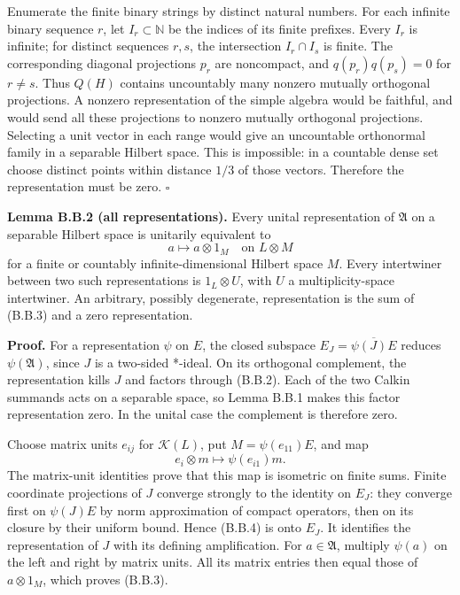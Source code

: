 \documentclass[
  11pt,
]{article}
\begin{document}
Enumerate the finite binary strings by distinct natural numbers. For
each infinite binary sequence \(r\), let \(I_r\subset\mathbb N\) be the
indices of its finite prefixes. Every \(I_r\) is infinite; for distinct
sequences \(r,s\), the intersection \(I_r\cap I_s\) is finite. The
corresponding diagonal projections \(p_r\) are noncompact, and
\(q(p_r)q(p_s)=0\) for \(r\ne s\). Thus \(Q(H)\) contains uncountably
many nonzero mutually orthogonal projections. A nonzero representation
of the simple algebra would be faithful, and would send all these
projections to nonzero mutually orthogonal projections. Selecting a unit
vector in each range would give an uncountable orthonormal family in a
separable Hilbert space. This is impossible: in a countable dense set
choose distinct points within distance \(1/3\) of those vectors.
Therefore the representation must be zero. \(\square\)

\textbf{Lemma B.B.2 (all representations).} Every unital representation
of \(\mathfrak A\) on a separable Hilbert space is unitarily equivalent
to \[
a\longmapsto a\otimes1_M\quad\text{on }L\otimes M
\tag{B.B.3}
\] for a finite or countably infinite-dimensional Hilbert space \(M\).
Every intertwiner between two such representations is \(1_L\otimes U\),
with \(U\) a multiplicity-space intertwiner. An arbitrary, possibly
degenerate, representation is the sum of (B.B.3) and a zero
representation.

\textbf{Proof.} For a representation \(\psi\) on \(E\), the closed
subspace \(E_J=\overline{\psi(J)E}\) reduces \(\psi(\mathfrak A)\),
since \(J\) is a two-sided *-ideal. On its orthogonal complement, the
representation kills \(J\) and factors through (B.B.2). Each of the two
Calkin summands acts on a separable space, so Lemma B.B.1 makes this
factor representation zero. In the unital case the complement is
therefore zero.

Choose matrix units \(e_{ij}\) for \(\mathcal K(L)\), put
\(M=\psi(e_{11})E\), and map \[
e_i\otimes m\longmapsto\psi(e_{i1})m.
\tag{B.B.4}
\] The matrix-unit identities prove that this map is isometric on finite
sums. Finite coordinate projections of \(J\) converge strongly to the
identity on \(E_J\): they converge first on \(\psi(J)E\) by norm
approximation of compact operators, then on its closure by their uniform
bound. Hence (B.B.4) is onto \(E_J\). It identifies the representation
of \(J\) with its defining amplification. For \(a\in\mathfrak A\),
multiply \(\psi(a)\) on the left and right by matrix units. All its
matrix entries then equal those of \(a\otimes1_M\), which proves
(B.B.3).
\end{document}
